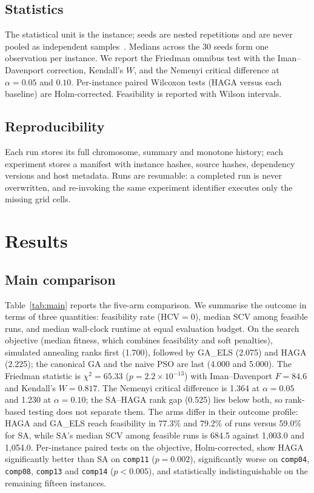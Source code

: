 \documentclass[journal]{IEEEtran}
\newcommand{\code}[1]{\texttt{#1}}
\begin{document}
\subsection{Statistics}
The statistical unit is the instance; seeds are nested repetitions and are never pooled as independent samples~\cite{demsar2006statistical}. Medians across the 30 seeds form one observation per instance. We report the Friedman omnibus test with the Iman--Davenport correction, Kendall's $W$, and the Nemenyi critical difference at $\alpha=0.05$ and $0.10$. Per-instance paired Wilcoxon tests (HAGA versus each baseline) are Holm-corrected. Feasibility is reported with Wilson intervals.

\subsection{Reproducibility}
Each run stores its full chromosome, summary and monotone history; each experiment stores a manifest with instance hashes, source hashes, dependency versions and host metadata. Runs are resumable: a completed run is never overwritten, and re-invoking the same experiment identifier executes only the missing grid cells.

\section{Results}
\label{sec:results}
\subsection{Main comparison}
Table~\ref{tab:main} reports the five-arm comparison. We summarise the outcome in terms of three quantities: feasibility rate (HCV$=0$), median SCV among feasible runs, and median wall-clock runtime at equal evaluation budget. On the search objective (median fitness, which combines feasibility and soft penalties), simulated annealing ranks first (1.700), followed by GA\_ELS (2.075) and HAGA (2.225); the canonical GA and the naive PSO are last (4.000 and 5.000). The Friedman statistic is $\chi^2=65.33$ ($p=2.2\times10^{-13}$) with Iman--Davenport $F=84.6$ and Kendall's $W=0.817$. The Nemenyi critical difference is 1.364 at $\alpha=0.05$ and 1.230 at $\alpha=0.10$; the SA--HAGA rank gap (0.525) lies below both, so rank-based testing does not separate them. The arms differ in their outcome profile: HAGA and GA\_ELS reach feasibility in 77.3\% and 79.2\% of runs versus 59.0\% for SA, while SA's median SCV among feasible runs is 684.5 against 1{,}003.0 and 1{,}054.0. Per-instance paired tests on the objective, Holm-corrected, show HAGA significantly better than SA on \code{comp11} ($p=0.002$), significantly worse on \code{comp04}, \code{comp08}, \code{comp13} and \code{comp14} ($p<0.005$), and statistically indistinguishable on the remaining fifteen instances.
\end{document}
